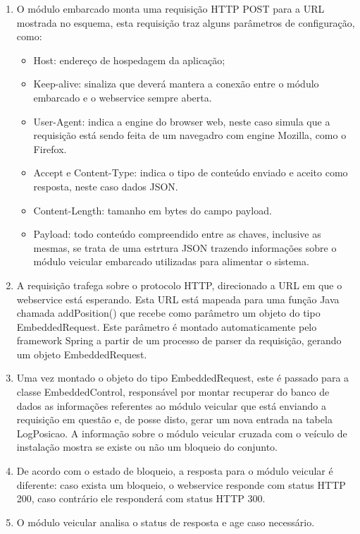 \begin{enumerate}
	\item O módulo embarcado monta uma requisição HTTP POST para a URL mostrada no esquema, esta requisição traz alguns parâmetros de configuração, como:
	\begin{itemize}
		\item Host: endereço de hospedagem da aplicação;
		\item Keep-alive: sinaliza que deverá mantera a conexão entre o módulo embarcado e o webservice sempre aberta.
		\item User-Agent: indica a engine do browser web, neste caso simula que a requisição está sendo feita de um navegadro com engine Mozilla, como o Firefox.
		\item Accept e Content-Type: indica o tipo de conteúdo enviado e aceito como resposta, neste caso dados JSON.
		\item Content-Length: tamanho em bytes do campo payload.
		\item Payload: todo conteúdo compreendido entre as chaves, inclusive as mesmas, se trata de uma estrtura JSON trazendo informações sobre o módulo veicular embarcado utilizadas para alimentar o sistema. 
	\end{itemize}
	
	\item A requisição trafega sobre o protocolo HTTP, direcionado a URL em que o webservice está esperando. Esta URL está mapeada para uma função Java chamada addPosition() que recebe como parâmetro um objeto do tipo EmbeddedRequest. Este parâmetro é montado automaticamente pelo framework Spring a partir de um processo de parser da requisição, gerando um objeto EmbeddedRequest.
	\item Uma vez montado o objeto do tipo EmbeddedRequest, este é passado para a classe EmbeddedControl, responsável por montar recuperar do banco de dados as informações referentes ao módulo veicular que está enviando a requisição em questão e, de posse disto, gerar um nova entrada na tabela LogPosicao. A informação sobre o módulo veicular cruzada com o veículo de instalação mostra se existe ou não um bloqueio do conjunto.
	\item De acordo com o estado de bloqueio, a resposta para o módulo veicular é diferente: caso exista um bloqueio, o webservice responde com status HTTP 200, caso contrário ele responderá com status HTTP 300.
	\item O módulo veicular analisa o status de resposta e age caso necessário.
\end{enumerate}


